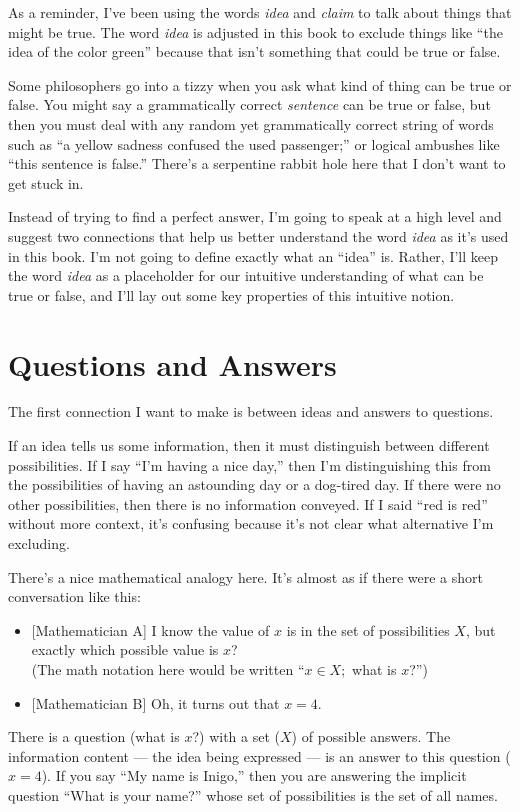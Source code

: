 \documentclass[9pt, twoside]{book}
\theoremstyle{argtstyle}
\begin{document}
As a reminder,
I've been using the words {\em idea} and {\em claim} to talk
about things that might be true.
The word {\em idea} is adjusted in this book to exclude
things like ``the idea of the color green'' because that isn't something that
could be true or false.

Some philosophers go into a tizzy when you ask
what kind of thing can be true or false.
You might say a grammatically correct {\em sentence} can be true or false,
but then you must deal with any random yet grammatically correct string
of words such as
``a yellow sadness confused the used
passenger;'' or logical ambushes like ``this sentence is false.''
There's a serpentine rabbit hole here that I don't want to get stuck in.

Instead of trying to find a perfect answer, I'm going to speak at a high level
and suggest two connections that help us better understand the word {\em idea}
as it's used in this book.
I'm not going to define exactly what an ``idea'' is.
Rather, I'll keep the word {\em idea} as a placeholder for our
intuitive understanding of what can be true or false, and I'll lay out some key
properties of this intuitive notion.

\section{Questions and Answers}

The first connection I want to make is between ideas and answers to questions.

If an idea tells us some information, then it must distinguish between different
possibilities. If I say ``I'm having a nice day,'' then I'm distinguishing this
from the possibilities of having an astounding day or a dog-tired day.
If there were no other possibilities,
then there is no information conveyed. If I said
``red is red'' without more context,
it's confusing because it's not clear what
alternative I'm excluding.

There's a nice mathematical analogy here. It's almost as if there were a short
conversation like this:
\begin{itemize}
    \item{} [Mathematician A] I know the value of $x$ is in the set of
        possibilities $X$, but exactly which possible value is $x$?\\
        (The math notation here would be written ``$x\in X;$ what is $x$?'')
    \item{} [Mathematician B] Oh, it turns out that $x=4$.
\end{itemize}
There is a question (what is $x$?) with a set ($X$) of possible answers. The
information content --- the idea being expressed ---
is an answer to this question ($x=4$). If you say ``My name is Inigo,''
then you are answering the implicit question ``What is your name?'' whose set of
possibilities is the set of all names.
\end{document}
